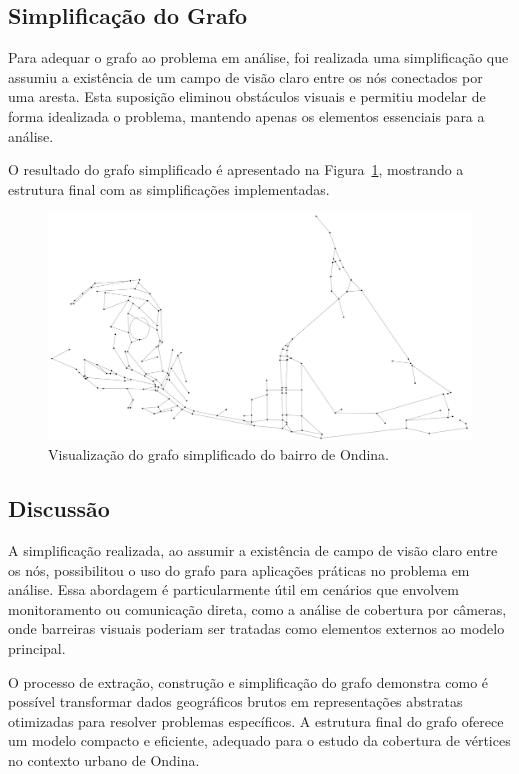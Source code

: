 \documentclass[12pt, a4paper]{report}
\begin{document}
\subsection{Simplificação do Grafo}

Para adequar o grafo ao problema em análise, foi realizada uma simplificação que assumiu a existência de um campo de visão claro entre os nós conectados por uma aresta. Esta suposição eliminou obstáculos visuais e permitiu modelar de forma idealizada o problema, mantendo apenas os elementos essenciais para a análise.

O resultado do grafo simplificado é apresentado na Figura~\ref{fig:ondina_grafo_simplificado}, mostrando a estrutura final com as simplificações implementadas.

\begin{figure}[H]
    \centering
    \includegraphics[width=\textwidth]{ondina_grafo_simplificado}
    \caption{Visualização do grafo simplificado do bairro de Ondina.}
    \label{fig:ondina_grafo_simplificado}
\end{figure}

\subsection{Discussão}

A simplificação realizada, ao assumir a existência de campo de visão claro entre os nós, possibilitou o uso do grafo para aplicações práticas no problema em análise. Essa abordagem é particularmente útil em cenários que envolvem monitoramento ou comunicação direta, como a análise de cobertura por câmeras, onde barreiras visuais poderiam ser tratadas como elementos externos ao modelo principal.

O processo de extração, construção e simplificação do grafo demonstra como é possível transformar dados geográficos brutos em representações abstratas otimizadas para resolver problemas específicos. A estrutura final do grafo oferece um modelo compacto e eficiente, adequado para o estudo da cobertura de vértices no contexto urbano de Ondina.
\end{document}

